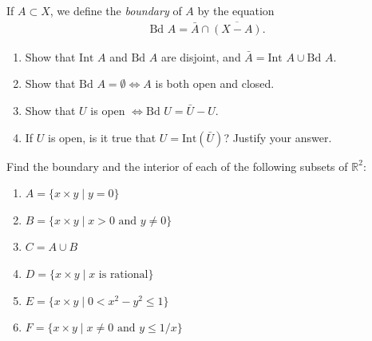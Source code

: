   \begin{exercise}[Munkres 17.19]
    If $A \subset X$, we define the \textit{boundary} of $A$ by the equation
    \begin{align*}
      \text{Bd } A = \bar{A} \cap \overline{(X - A)}.
    \end{align*}
    
    \begin{enumerate}
      \item Show that $\text{Int } A$ and $\text{Bd } A$ are disjoint, and $\bar{A} = \text{Int } A \cup \text{Bd } A$.
      \item Show that $\text{Bd } A = \emptyset \Leftrightarrow A$ is both open and closed.
      \item Show that $U$ is open $\Leftrightarrow \text{Bd } U = \bar{U} - U$.
      \item If $U$ is open, is it true that $U = \text{Int}(\bar{U})$? Justify your answer.
    \end{enumerate}
  \end{exercise}
  \begin{solution}
    
  \end{solution}

  \begin{exercise}[Munkres 17.20]
    Find the boundary and the interior of each of the following subsets of $\mathbb{R}^2$:
    \begin{enumerate}
      \item $A = \{x \times y \mid y = 0\}$
      \item $B = \{x \times y \mid x > 0 \text{ and } y \neq 0\}$
      \item $C = A \cup B$
      \item $D = \{x \times y \mid x \text{ is rational}\}$
      \item $E = \{x \times y \mid 0 < x^2 - y^2 \leq 1\}$
      \item $F = \{x \times y \mid x \neq 0 \text{ and } y \leq 1/x\}$
    \end{enumerate}
  \end{exercise}
  \begin{solution}
    
  \end{solution}

